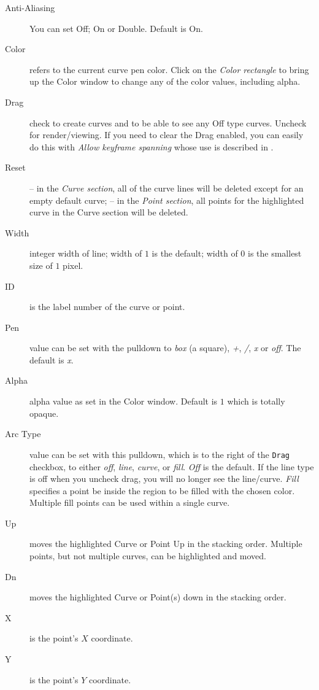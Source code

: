 \begin{description}
	\item[Anti-Aliasing] You can set Off; On or Double. Default is On.
    \item[Color] refers to the current curve pen color. Click on the \textit{Color rectangle} to bring up the Color window to change any of the color values, including alpha.
    \item[Drag] check to create curves and to be able to see any Off type curves. Uncheck for render/viewing.  If you need to clear the Drag enabled, you can easily do this with \textit{Allow keyframe spanning} whose use is described in .
    \item[Reset] -- in the \textit{Curve section}, all of the curve lines will be deleted except for an empty default curve;
    -- in the \textit{Point section}, all points for the highlighted curve in the Curve section will be deleted.
    \item[Width] integer width of line; width of $1$ is the default; width of $0$ is the smallest size of $1$ pixel.
    \item[ID] is the label number of the curve or point.
    \item[Pen] value can be set with the pulldown to \textit{box} (a square), \textit{+}, \textit{/}, \textit{x} or \textit{off}. The default is \textit{x}.
    \item[Alpha] alpha value as set in the Color window. Default is $1$ which is totally opaque.
    \item[Arc Type] value can be set with this pulldown, which is to the right of the \texttt{Drag} checkbox, to either \textit{off}, \textit{line}, \textit{curve}, or \textit{fill}. \textit{Off} is the default. If the line type is off when you uncheck drag, you will no longer see the line/curve. \textit{Fill} specifies a point be inside the region to be filled with the chosen color. Multiple fill points can be used within a single curve.
    \item[Up] moves the highlighted Curve or Point Up in the stacking order. Multiple points, but not multiple curves, can be highlighted and moved.
    \item[Dn] moves the highlighted Curve or Point(s) down in the stacking order.
    \item[X] is the point’s $X$ coordinate.
    \item[Y] is the point’s $Y$ coordinate.
\end{description}

